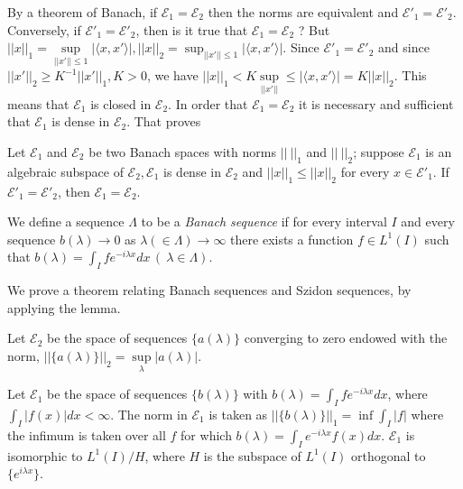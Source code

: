 By a theorem of Banach, if $\mathscr{E}_1 = \mathscr{E}_2 $ then the
norms are equivalent and $\mathscr{E}'_1 =
\mathscr{E}'_2$. Conversely, if $\mathscr{E}'_1 = \mathscr{E}'_2$,
then is it true that $\mathscr{E}_1 = \mathscr{E}_2$ ? But $|| x ||_1 =
\sup\limits_{|| x' || \le 1} \big | \langle x, x' \rangle |, || x ||_2
= \sup_{|| x ' || \le 1} \big | \langle x, x' \rangle \big |$. Since
$\mathscr{E}'_1 = \mathscr{E}'_2$ and since $|| x' ||_2 \ge K^{-1} ||
x' ||_1, K > 0$, we have $|| x ||_1 < K \sup\limits_{|| x' ||} \le
\big | \langle x, x' \rangle \big | = K || x ||_2$. This means that
$\mathscr{E}_1$ is closed in $\mathscr{E}_2$. In order that
$\mathscr{E}_1 = \mathscr{E}_2$ it is necessary and sufficient that
$\mathscr{E}_1$ is dense in $\mathscr{E}_2$. That proves 
\begin{lemma*} %
  Let $\mathscr{E}_1 $ and $\mathscr{E}_2$ be two Banach spaces with
  norms $|| ~ ||_1$ and $|| ~ ||_2$; suppose $\mathscr{E}_1$ is an
  algebraic subspace of $\mathscr{E}_2, \mathscr{E}_1$ is dense in
  $\mathscr{E}_2$ and $|| x ||_1 \le || x ||_2$ for every $x \in
  \mathscr{E}'_1$. If $\mathscr{E}'_1 = \mathscr{E}'_2$, then
  $\mathscr{E}_1 = \mathscr{E}_2$.
\end{lemma*}

\begin{defi*} %
 We define a sequence $\Lambda$ to be a {\em Banach sequence } if for
 every interval $I$ and every sequence $b (\lambda) \to 0$ as
 $\lambda (\in \Lambda) \to \infty$ there exists a function $f \in
 L^1 (I)$ such that $b (\lambda) = \int_I f e^{- i \lambda x} dx \,(~
 \lambda \in \Lambda)$. 
\end{defi*}

We prove a theorem relating Banach sequences and Szidon sequen\-ces, by
applying the lemma. 

Let $\mathscr{E}_2$ be the space of sequences $\big \{ a( \lambda)
\big \}$ converging to zero endowed with the norm, $|| \{ a (\lambda
)\} ||_2 = \sup\limits_{\lambda} \big | a (\lambda) \big |$. 

Let $\mathscr{E}_1$ be the space of sequences $\{b (\lambda) \}$ with
$b (\lambda) = \int_I f e^{-i \lambda x} dx$, where $\int_I \big | f
(x) \big | dx < \infty$. The norm in $\mathscr{E}_1$ is taken as $||
\{b (\lambda) \} ||_1 = \inf \int_I | f |$ where the infimum is taken
over all $f$ for which $b(\lambda) = \int_I e^{-i \lambda x} f (x)
dx$. $\mathscr{E}_1$ is isomorphic to $L^1 (I) / H$, where $H$ is the
subspace of $L^1 (I)$ orthogonal to $\{e^{i \lambda x} \}$. 

